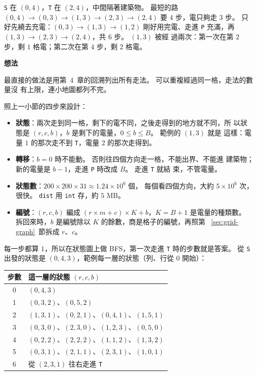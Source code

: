 \texttt{S} 在 $(0, 4)$，\texttt{T} 在 $(2, 4)$，中間隔著建築物。 最短的路
$(0, 4) \to (0, 3) \to (1, 3) \to (2, 3) \to (2, 4)$ 要 $4$ 步，電只夠走 $3$
步。 只好先繞去充電：$(0, 3) \to (1, 3) \to (1, 2)$ 剛好用完電、走進
\texttt{P} 充滿，再 $(1, 3) \to (2, 3) \to (2, 4)$，共 $6$ 步。 $(1, 3)$ 被經
過兩次：第一次在第 $2$ 步，剩 $1$ 格電；第二次在第 $4$ 步，剩 $2$ 格電。

\textbf{想法}

最直接的做法是用第~4~章的回溯列出所有走法。 可以重複經過同一格，走法的數量沒
有上限，連小地圖都列不完。

照上一小節的四步來設計：

\begin{itemize}
\item \textbf{狀態}：兩次走到同一格，剩下的電不同，之後走得到的地方就不同，所
以狀態是 $(r, c, b)$，$b$ 是剩下的電量，$0 \le b \le B$。 範例的 $(1, 3)$ 就是
這樣：電量 $1$ 的那次走不到 \texttt{T}，電量 $2$ 的那次走得到。
\item \textbf{轉移}：$b = 0$ 時不能動。 否則往四個方向走一格，不能出界、不能進
建築物；新的電量是 $b - 1$，走進 \texttt{P} 時改成 $B$。 走進 \texttt{T} 就結
束，不管電量。
\item \textbf{狀態數}：$200 \times 200 \times 31 \approx 1.24 \times 10^6$ 個，
每個看四個方向，大約 $5 \times 10^6$ 次，很快。 \texttt{dist} 用 \texttt{int}
存，約 $5$ MB。
\item \textbf{編號}：$(r, c, b)$ 編成 $(r \times m + c) \times K + b$，$K = B + 1$
是電量的種類數。 拆回來時，$b$ 是編號除以 $K$ 的餘數，商是格子的編號，再照第
~\ref{sec:grid-graph}~節拆成 $r$、$c$。
\end{itemize}

每一步都算 $1$，所以在狀態圖上做 BFS，第一次走進 \texttt{T} 時的步數就是答案。
從 \texttt{S} 出發的狀態是 $(0, 4, 3)$，範例每一層的狀態（列、行從 $0$ 開始）：

\begin{center}
\begin{tabular}{cl}
\toprule
步數 & 這一層的狀態 $(r, c, b)$ \\
\midrule
0 & $(0,4,3)$ \\
1 & $(0,3,2)$、$(0,5,2)$ \\
2 & $(1,3,1)$、$(0,2,1)$、$(0,4,1)$、$(1,5,1)$ \\
3 & $(0,3,0)$、$(2,3,0)$、$(1,2,3)$、$(0,5,0)$ \\
4 & $(0,2,2)$、$(2,2,2)$、$(1,1,2)$、$(1,3,2)$ \\
5 & $(0,3,1)$、$(2,1,1)$、$(2,3,1)$、$(1,0,1)$ \\
6 & 從 $(2,3,1)$ 往右走進 \texttt{T} \\
\bottomrule
\end{tabular}
\end{center}

